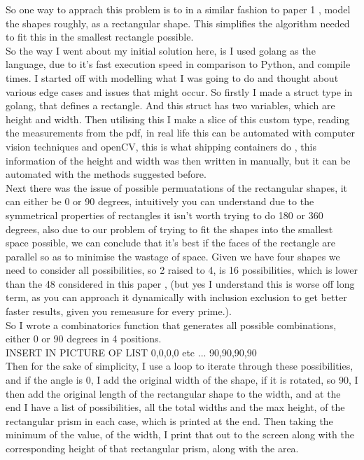 \documentclass[a4paper]{article}
\begin{document}
    
    So one way to apprach this problem is to in a similar fashion to paper 1 \cite{mongolia}, model the shapes roughly, as a rectangular shape. This simplifies the algorithm needed to fit this in the smallest rectangle possible. \\

    So the way I went about my initial solution here, is I used golang as the language, due to it's fast execution speed in comparison to Python, and compile times. I started off with modelling what I was going to do and thought about various edge cases and issues that might occur. So firstly I made a struct type in golang, that defines a rectangle. And this struct has two variables, which are height and width. Then utilising this I make a slice of this custom type, reading the measurements from the pdf, in real life this can be automated with computer vision techniques and openCV, this is what shipping containers do \cite{packing}, this information of the height and width was then written in manually, but it can be automated with the methods suggested before.\\

    Next there was the issue of possible permuatations of the rectangular shapes, it can either be 0 or 90 degrees, intuitively you can understand due to the symmetrical properties of rectangles it isn't worth trying to do 180 or 360 degrees, also due to our problem of trying to fit the shapes into the smallest space possible, we can conclude that it's best if the faces of the rectangle are parallel so as to minimise the wastage of space. Given we have four shapes we need to consider all possibilities, so 2 raised to 4, is 16 possibilities, which is lower than the 48 considered in this paper \cite{bismark}, (but yes I understand this is worse off long term, as you can approach it dynamically with inclusion exclusion to get better faster results, given you remeasure for every prime.). \\

    So I wrote a combinatorics function that generates all possible combinations, either 0 or 90 degrees in 4 positions. \\

    INSERT IN PICTURE OF LIST 0,0,0,0 etc ... 90,90,90,90\\

    Then for the sake of simplicity, I use a loop to iterate through these possibilities, and if the angle is 0, I add the original width of the shape, if it is rotated, so 90, I then add the original length of the rectangular shape to the width, and at the end I have a list of possibilities, all the total widths and the max height, of the rectangular prism in each case, which is printed at the end. Then taking the minimum of the value, of the width, I print that out to the screen along with the corresponding height of that rectangular prism, along with the area.\\
\end{document}
